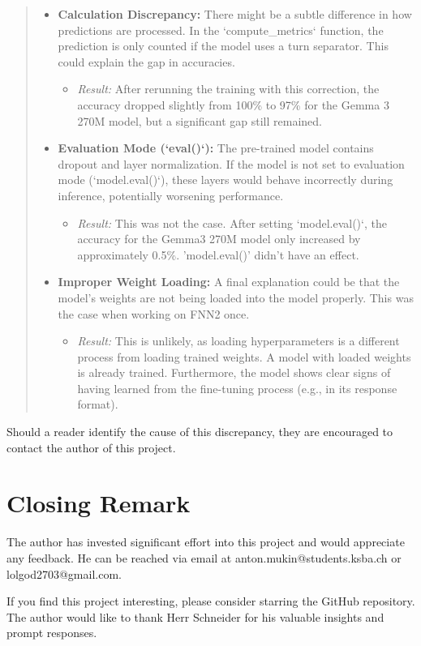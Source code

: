 \documentclass{article}
\begin{document}
\begin{quote}
{\begin{itemize}
    \item \textbf{Calculation Discrepancy:} There might be a subtle difference in how predictions are processed. In the `compute\_metrics` function, the prediction is only counted if the model uses a turn separator. This could explain the gap in accuracies.
        \begin{itemize}
            \item \textit{Result:} After rerunning the training with this correction, the accuracy dropped slightly from 100\% to 97\% for the Gemma 3 270M model, but a significant gap still remained.
        \end{itemize}

    \item \textbf{Evaluation Mode (`eval()`):} The pre-trained model contains dropout and layer normalization. If the model is not set to evaluation mode (`model.eval()`), these layers would behave incorrectly during inference, potentially worsening performance.
        \begin{itemize}
            \item \textit{Result:} This was not the case. After setting `model.eval()`, the accuracy for the Gemma3 270M model only increased by approximately 0.5\%. 'model.eval()' didn't have an effect.
        \end{itemize}

    \item \textbf{Improper Weight Loading:} A final explanation could be that the model's weights are not being loaded into the model properly. This was the case when working on FNN2 once.
        \begin{itemize}
            \item \textit{Result:} This is unlikely, as loading hyperparameters is a different process from loading trained weights. A model with loaded weights is already trained. Furthermore, the model shows clear signs of having learned from the fine-tuning process (e.g., in its response format).
        \end{itemize}
\end{itemize}
}
\end{quote}
Should a reader identify the cause of this discrepancy, they are encouraged to contact the author of this project.
\newpage
\section{Closing Remark}

The author has invested significant effort into this project and would appreciate any feedback. He can be reached via email at anton.mukin@students.ksba.ch or lolgod2703@gmail.com.

If you find this project interesting, please consider starring the GitHub repository.
\\[2em]
The author would like to thank Herr Schneider for his valuable insights and prompt responses.


\newpage
\printbibliography[heading=bibintoc]
\end{document}
